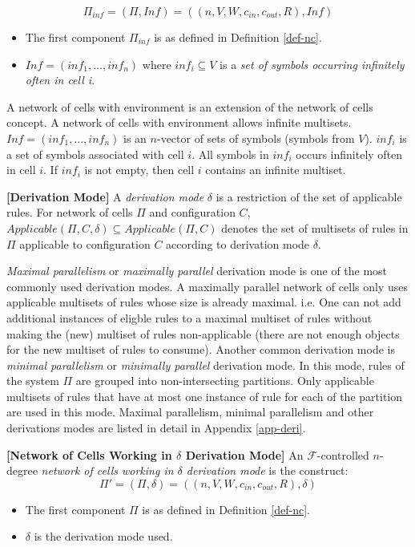 \documentclass[a4paper]{article}
\theoremstyle{definition}
\begin{document}
$$\Pi_{inf} = (\Pi,Inf) = ((n,V,W,c_{in},c_{out},R), Inf)$$
\begin{itemize}
\item The first component $\Pi_{inf}$ is as defined in Definition \ref{def-nc}.
\item $Inf = (inf_1,...,inf_n)$ where $inf_i \subseteq V$ is a \emph{set of symbols occurring 
infinitely often in cell i}.
\end{itemize}

A network of cells with environment is an extension of the network of cells concept. A network of
cells with environment allows infinite multisets. $Inf=(inf_1,...,inf_n)$ is an $n$-vector of sets 
of symbols (symbols from $V$). $inf_i$ is a set of symbols associated with cell $i$. All symbols in 
$inf_i$ occurs infinitely often in cell $i$. If $inf_i$ is not empty, then cell $i$ contains an
infinite multiset. 


\label{def-derv} \textbf{[Derivation Mode]} A \emph{derivation mode} $\delta$ is a
restriction of the set of applicable rules. For network of cells $\Pi$ and configuration $C$, 
$Applicable(\Pi, C, \delta) \subseteq Applicable(\Pi, C)$ denotes the set of multisets of
rules in $\Pi$ applicable to configuration $C$ according to derivation mode $\delta$. 

\emph{Maximal parallelism} or \emph{maximally parallel} derivation mode is one of the most commonly
used derivation modes. A maximally parallel network of cells only uses applicable multisets of rules
whose size is already maximal. i.e. One can not add additional instances of eligble rules to a
maximal multiset of rules without making the (new) multiset of rules non-applicable (there are not 
enough objects for the new multiset of rules to consume). Another common derivation mode is 
\emph{minimal parallelism} or \emph{minimally parallel} derivation mode. In this mode, rules of the 
system $\Pi$ are grouped into non-intersecting partitions. Only applicable multisets of rules that 
have at most one instance of rule for each of the partition are used in this mode. Maximal 
parallelism, minimal parallelism and other derivations modes are listed in detail in Appendix 
\ref{app-deri}.


\label{def-nc3}\textbf{[Network of Cells Working in $\delta$ Derivation Mode]} An
$\mathscr{F}$-controlled $n$-degree \emph{network of cells working in $\delta$ derivation mode} is 
the construct: $$\Pi' = (\Pi,\delta) = ((n,V,W,c_{in},c_{out},R), \delta)$$
\begin{itemize}
\item The first component $\Pi$ is as defined in Definition \ref{def-nc}.
\item $\delta$ is the derivation mode used.
\end{itemize}
\end{document}

